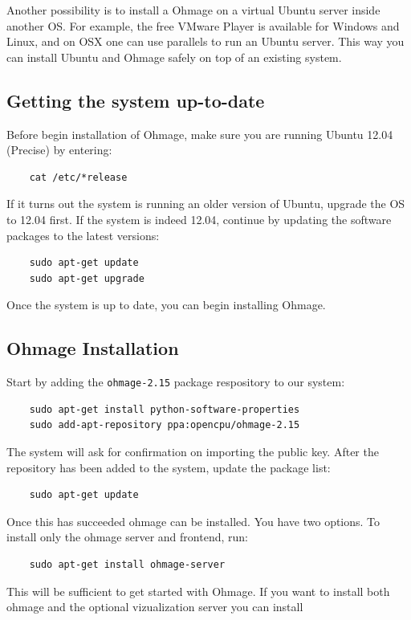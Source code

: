 \documentclass{scrartcl}
\begin{document}
\noindent Another possibility is to install a Ohmage on a virtual Ubuntu server
inside another OS. For example, the free VMware Player is available for Windows 
and Linux, and on OSX one can use parallels to run an Ubuntu server. This way
you can install Ubuntu and Ohmage safely on top of an existing system.

\subsection{Getting the system up-to-date}

\noindent Before begin installation of Ohmage, make sure you are running Ubuntu
12.04 (Precise) by entering:

\begin{verbatim}
    cat /etc/*release
\end{verbatim}
If it turns out the system is running an older version of Ubuntu, upgrade the OS
to 12.04 first. If the system is indeed 12.04, continue by updating the software
packages to the latest versions:

\begin{verbatim}
    sudo apt-get update
    sudo apt-get upgrade
\end{verbatim}
Once the system is up to date, you can begin installing Ohmage.

\subsection{Ohmage Installation}

Start by adding the \texttt{ohmage-2.15} package respository to our system:

\begin{verbatim}
    sudo apt-get install python-software-properties
    sudo add-apt-repository ppa:opencpu/ohmage-2.15
\end{verbatim}
The system will ask for confirmation on importing the public key. After the
repository has been added to the system, update the package list:

\begin{verbatim}
    sudo apt-get update
\end{verbatim}
Once this has succeeded ohmage can be installed. You have two options. To
install only the ohmage server and frontend, run:

\begin{verbatim}
    sudo apt-get install ohmage-server
\end{verbatim}
This will be sufficient to get started with Ohmage. If you want to install both
ohmage and the optional vizualization server you can install
\end{document}

